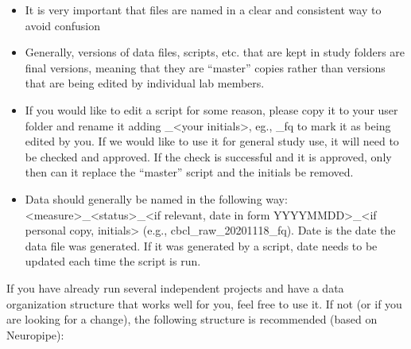 \documentclass[
]{book}
\providecommand{\tightlist}{%
  \setlength{\itemsep}{0pt}\setlength{\parskip}{0pt}}
\begin{document}
\begin{itemize}
\tightlist
\item
  It is very important that files are named in a clear and consistent way to avoid confusion
\item
  Generally, versions of data files, scripts, etc. that are kept in study folders are final versions, meaning that they are ``master'' copies rather than versions that are being edited by individual lab members.
\item
  If you would like to edit a script for some reason, please copy it to your user folder and rename it adding \_\textless your initials\textgreater, eg., \_fq to mark it as being edited by you. If we would like to use it for general study use, it will need to be checked and approved. If the check is successful and it is approved, only then can it replace the ``master'' script and the initials be removed.
\item
  Data should generally be named in the following way: \textless measure\textgreater\_\textless status\textgreater\_\textless if relevant, date in form YYYYMMDD\textgreater\_\textless if personal copy, initials\textgreater{} (e.g., cbcl\_raw\_20201118\_fq). Date is the date the data file was generated. If it was generated by a script, date needs to be updated each time the script is run.
\end{itemize}

If you have already run several independent projects and have a data organization structure that works well for you, feel free to use it. If not (or if you are looking for a change), the following structure is recommended (based on Neuropipe):
\end{document}
